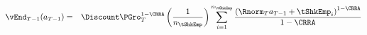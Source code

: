   \begin{eqnarray}
    \vEnd_{T-1}({a}_{T-1}) & = &   \Discount \PGro_{T}^{1-\CRRA}\left(\frac{1}{n_{\tShkEmp}}\right)\sum_{i=1}^{n_{\tShkEmp}}   \frac{\left( \Rnorm_{T} {a}_{T-1} + \tShkEmp_{i}\right)^{1-\CRRA}}{1-\CRRA} \label{eq:vDiscrete}
  \end{eqnarray}
